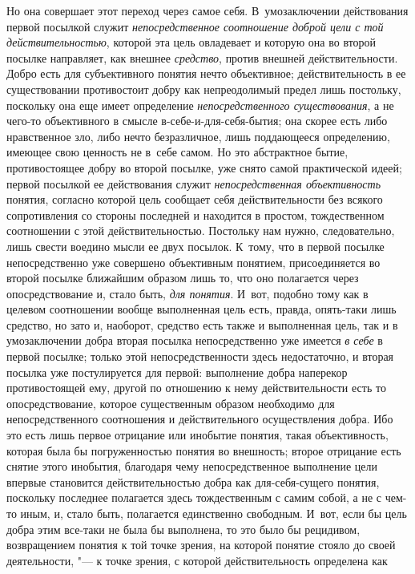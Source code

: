 Но она совершает этот переход через самое себя.
В~умозаключении действования первой посылкой служит
{\em непосредственное соотношение доброй
цели с той действительностью}, которой эта цель овладевает и
которую она во второй посылке направляет, как внешнее {\em средство}, против
внешней действительности. Добро есть для субъективного понятия нечто
объективное; действительность в ее существовании противостоит добру как
непреодолимый предел лишь постольку, поскольку она еще имеет определение
{\em непосредственного существования},
а не чего-то объективного в смысле в-себе-и-для-себя-бытия;
она скорее есть либо нравственное зло, либо нечто безразличное, лишь
поддающееся определению, имеющее свою ценность не в~себе самом. Но это
абстрактное бытие, противостоящее добру во второй посылке,
уже снято самой практической идеей; первой посылкой ее действования служит
{\em непосредственная объективность}
понятия, согласно которой цель сообщает себя действительности
без всякого сопротивления со стороны последней и находится в простом,
тождественном соотношении с этой действительностью. Постольку нам нужно,
следовательно, лишь свести воедино мысли ее двух посылок. К~тому, что в
первой посылке непосредственно уже совершено объективным понятием,
присоединяется во второй посылке ближайшим образом лишь то, что оно
полагается через опосредствование и, стало быть,
{\em для понятия}. И~вот,
подобно тому как в целевом соотношении вообще выполненная цель есть,
правда, опять-таки лишь средство, но зато и, наоборот, средство есть также
и выполненная цель, так и в умозаключении добра вторая посылка
непосредственно уже имеется {\em в
себе} в первой посылке; только этой непосредственности здесь
недостаточно, и вторая посылка уже постулируется для первой: выполнение
добра наперекор противостоящей ему, другой по отношению к нему
действительности есть то опосредствование, которое существенным образом
необходимо для непосредственного соотношения и действительного
осуществления добра. Ибо это есть лишь первое отрицание или инобытие
понятия, такая объективность, которая была бы погруженностью понятия во
внешность; второе отрицание есть снятие этого инобытия, благодаря чему
непосредственное выполнение цели впервые становится действительностью добра
как для-себя-сущего понятия, поскольку последнее полагается здесь
тождественным с самим собой, а не с чем-то иным, и, стало быть,
полагается единственно свободным. И~вот, если бы цель добра этим все-таки
не была бы выполнена, то это было бы рецидивом, возвращением понятия к той
точке зрения, на которой понятие стояло до своей деятельности, "---
к точке зрения, с которой действительность определена как
